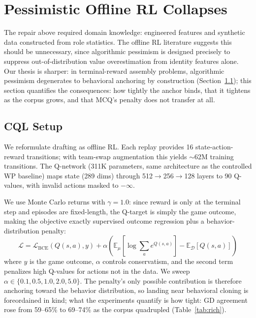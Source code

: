 \documentclass[journal]{IEEEtran}
\begin{document}
\section{Pessimistic Offline RL Collapses}
\label{sec:cql}

The repair above required domain knowledge: engineered features and synthetic data constructed from role statistics. The offline RL literature suggests this should be unnecessary, since algorithmic pessimism is designed precisely to suppress out-of-distribution value overestimation from identity features alone. Our thesis is sharper: in terminal-reward assembly problems, algorithmic pessimism degenerates to behavioral anchoring by construction (Section~\ref{sec:cqlsetup}); this section quantifies the consequences: how tightly the anchor binds, that it tightens as the corpus grows, and that MCQ's penalty does not transfer at all.

\subsection{CQL Setup}
\label{sec:cqlsetup}

We reformulate drafting as offline RL. Each replay provides 16 state-action-reward transitions; with team-swap augmentation this yields $\sim$62M training transitions.
The Q-network (311K parameters, same architecture as the controlled WP baseline) maps state (289 dims) through 512$\to$256$\to$128 layers to 90 Q-values, with invalid actions masked to $-\infty$.

We use Monte Carlo returns with $\gamma = 1.0$: since reward is only at the terminal step and episodes are fixed-length, the Q-target is simply the game outcome, making the objective exactly supervised outcome regression plus a behavior-distribution penalty:
\begin{equation}
\mathcal{L} = \mathcal{L}_\text{BCE}(Q(s,a), y) + \alpha \left( \mathbb{E}_\mu[\log \sum_a e^{Q(s,a)}] - \mathbb{E}_\mathcal{D}[Q(s,a)] \right)
\end{equation}
where $y$ is the game outcome, $\alpha$ controls conservatism, and the second term penalizes high Q-values for actions not in the data. We sweep $\alpha \in \{0.1, 0.5, 1.0, 2.0, 5.0\}$. The penalty's only possible contribution is therefore anchoring toward the behavior distribution, so landing near behavioral cloning is foreordained in kind; what the experiments quantify is how tight: GD agreement rose from 59--65\% to 69--74\% as the corpus quadrupled (Table~\ref{tab:rich}).
\end{document}
